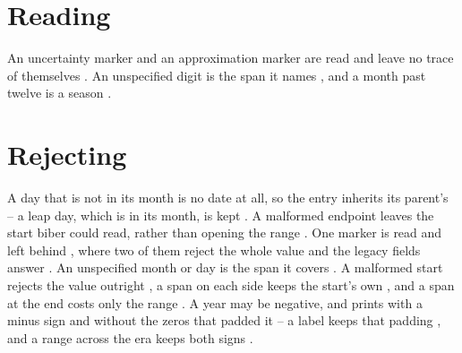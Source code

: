 \documentclass[acmsmall,nonacm,natbib=false]{acmart}
\begin{document}
\thispagestyle{empty}

\section*{Reading}
An uncertainty marker and an approximation marker are read and leave no trace of themselves \cite{EdQ,EdT}.
An unspecified digit is the span it names \cite{EdX}, and a month past twelve is a season \cite{EdS}.

\section*{Rejecting}
A day that is not in its month is no date at all, so the entry inherits its parent's \cite{CaFeb29} -- a leap day, which is in its month, is kept \cite{CaLeap}.
A malformed endpoint leaves the start biber could read, rather than opening the range \cite{CaBadEnd}.
One marker is read and left behind \cite{EdPct}, where two of them reject the whole value and the legacy fields answer \cite{EdDouble}.
An unspecified month or day is the span it covers \cite{EdMonthX,EdDayX}.
A malformed start rejects the value outright \cite{RgBadStart}, a span on each side keeps the start's own \cite{RgXX}, and a span at the end costs only the range \cite{RgXEnd}.
A year may be negative, and prints with a minus sign and without the zeros that padded it \cite{NgYear} -- a label keeps that padding \cite{PsEarly}, and a range across the era keeps both signs \cite{NgRange,NgCross}.

\printbibliography
\end{document}
